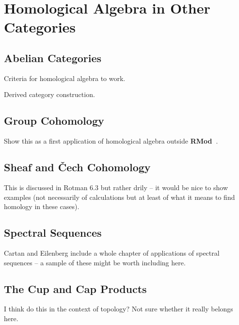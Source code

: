 \documentclass[oneside,english]{amsbook}
\numberwithin{section}{chapter}
\theoremstyle{plain}
\theoremstyle{definition}
\providecommand{\Cech}{\v{C}ech }
\newcommand{\catname}[1]{{\normalfont\textbf{#1}}}
\newcommand{\RMod}{\catname{RMod\ }}
\begin{document}
	\part{Homological Algebra in Other Categories}
	
	\chapter{Abelian Categories}
	
		Criteria for homological algebra to work.
		
		Derived category construction.
	
	\chapter{Group Cohomology}
	
		Show this as a first application of homological algebra outside \RMod.
	
	\chapter{Sheaf and \Cech Cohomology}

		This is discussed in Rotman 6.3 but rather drily -- it would be nice to show examples (not necessarily of calculations but at least of what it means to find homology in these cases).
		
	\chapter{Spectral Sequences}

		Cartan and Eilenberg include a whole chapter of applications of spectral sequences -- a sample of these might be worth including here.

	\chapter{The Cup and Cap Products}

		I think do this in the context of topology? Not sure whether it really belongs here.
	
	
\end{document}
